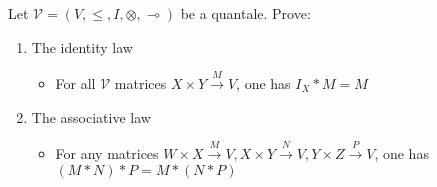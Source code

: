 Let $\mathcal{V}=(V,\leq,I,\otimes,\multimap)$ be a quantale. Prove:
    \begin{enumerate}
      \item The identity law
            \begin{itemize}
              \item For all $\mathcal{V}$ matrices $X\times Y\xrightarrow{M}V$, one has $I_X * M = M$
            \end{itemize}
      \item The associative law
            \begin{itemize}
              \item For any matrices $W \times X \xrightarrow{M} V, X \times Y \xrightarrow{N} V, Y \times Z \xrightarrow{P} V$, one has $(M*N)*P=M*(N*P)$
            \end{itemize}
    \end{enumerate}